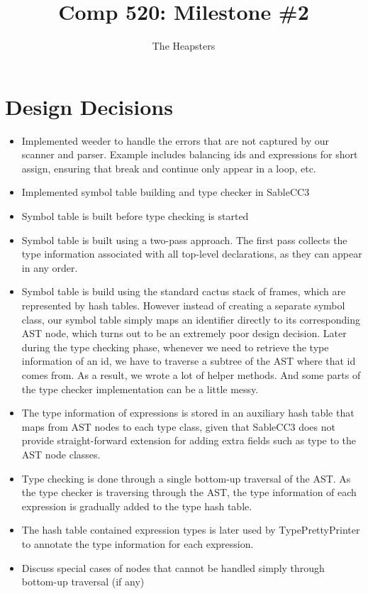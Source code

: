 \documentclass{article}
\title{Comp 520: Milestone \#2}
\author{The Heapsters}
\date{}
\begin{document}
\maketitle

\section{Design Decisions}

\begin{itemize}
\item Implemented weeder to handle the errors that are not captured by our scanner and parser. Example includes balancing ids and expressions for short assign, ensuring that break and continue only appear in a loop, etc.
\item Implemented symbol table building and type checker in SableCC3
\item Symbol table is built before type checking is started
\item Symbol table is built using a two-pass approach. The first pass collects the type information associated with all top-level declarations, as they can appear in any order.
\item Symbol table is build using the standard cactus stack of frames, which are represented by hash tables. However instead of creating a separate symbol class, our symbol table simply maps an identifier directly to its corresponding AST node, which turns out to be an extremely poor design decision. Later during the type checking phase, whenever we need to retrieve the type information of an id, we have to traverse a subtree of the AST where that id comes from. As a result, we wrote a lot of helper methods. And some parts of the type checker implementation can be a little messy.
\item The type information of expressions is stored in an auxiliary hash table that maps from AST nodes to each type class, given that SableCC3 does not provide straight-forward extension for adding extra fields such as type to the AST node classes.
\item Type checking is done through a single bottom-up traversal of the AST. As the type checker is traversing through the AST, the type information of each expression is gradually added to the type hash table.
\item The hash table contained expression types is later used by TypePrettyPrinter to annotate the type information for each expression.
\item Discuss special cases of nodes that cannot be handled simply through bottom-up traversal (if any)
\end{itemize}
\end{document}
